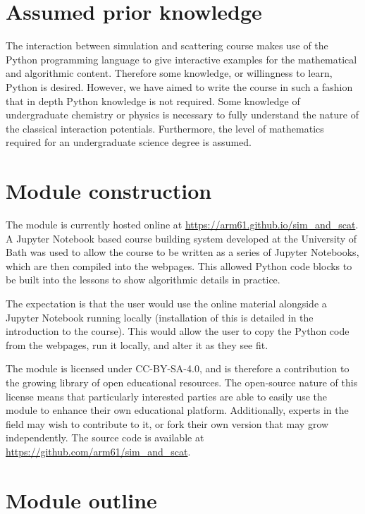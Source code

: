 \documentclass[pdf]{iucr}              %
\begin{document}
\section{Assumed prior knowledge}

The interaction between simulation and scattering course makes use of the Python programming language to give interactive examples for the mathematical and algorithmic content.
Therefore some knowledge, or willingness to learn, Python is desired.
However, we have aimed to write the course in such a fashion that in depth Python knowledge is not required.
Some knowledge of undergraduate chemistry or physics is necessary to fully understand the nature of the classical interaction potentials.
Furthermore, the level of mathematics required for an undergraduate science degree is assumed.

\section{Module construction}

The module is currently hosted online at \url{https://arm61.github.io/sim_and_scat}.
A Jupyter Notebook based course building system developed at the University of Bath was used to allow the course to be written as a series of Jupyter Notebooks, which are then compiled into the webpages.
This allowed Python code blocks to be built into the lessons to show algorithmic details in practice.

The expectation is that the user would use the online material alongside a Jupyter Notebook running locally (installation of this is detailed in the introduction to the course).
This would allow the user to copy the Python code from the webpages, run it locally, and alter it as they see fit.

The module is licensed under CC-BY-SA-4.0, and is therefore a contribution to the growing library of open educational resources.
The open-source nature of this license means that particularly interested parties are able to easily use the module to enhance their own educational platform.
Additionally, experts in the field may wish to contribute to it, or fork their own version that may grow independently.
The source code is available at \url{https://github.com/arm61/sim_and_scat}.


\section{Module outline}
\end{document}
